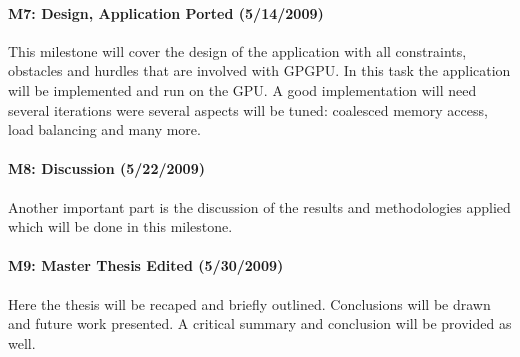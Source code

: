 \paragraph{M7: Design, Application Ported (5/14/2009)} %
\label{par:m7_design_application_ported}
This milestone will cover the design of the application with all constraints,
obstacles and hurdles that are involved with GPGPU. In this task the application
will be implemented and run on the GPU. A good implementation will need several
iterations were several aspects will be tuned: coalesced memory access, load
balancing and many more.
\paragraph{M8: Discussion (5/22/2009)} %
\label{par:m8_discussion}
Another important part is the discussion of the results and methodologies
applied which will be done in this milestone.

\paragraph{M9: Master Thesis Edited (5/30/2009)} %
\label{par:master_thesis_edited}
Here the thesis will be recaped and briefly outlined. Conclusions will be drawn
and future work presented. A critical summary and conclusion will be provided as
well. %


 



